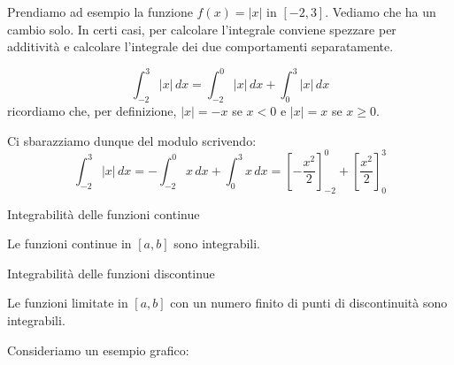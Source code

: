 \documentclass[12pt]{report}
\begin{document}
	Prendiamo ad esempio la funzione $f(x) = |x|$ in $[-2, 3]$.
	Vediamo che ha un cambio solo. In certi casi, per calcolare l'integrale conviene spezzare per additività e calcolare l'integrale dei due comportamenti separatamente.
	
	\[
	\int_{-2}^{3} |x| \, dx = \int_{-2}^{0} |x| \, dx + \int_{0}^{3} |x| \, dx
	\]
	ricordiamo che, per definizione, $|x| = -x$ se $x < 0$ e $|x| = x$ se $x \geq 0$.
	
	Ci sbarazziamo dunque del modulo scrivendo:
	\[
	\int_{-2}^{3} |x| \, dx = -\int_{-2}^{0} x \, dx + \int_{0}^{3} x \, dx = \left[ -\frac{x^2}{2} \right]_{-2}^{0} + \left[ \frac{x^2}{2} \right]_{0}^{3}
	\]
	
	\begin{teorema}{Integrabilità delle funzioni continue}{}
		
		Le funzioni continue in $[a, b]$ sono integrabili.
		
	\end{teorema}
	
	\begin{teorema}{Integrabilità delle funzioni discontinue}{}
		
		Le funzioni limitate in $[a, b]$ con un numero finito di punti di discontinuità sono integrabili.
		
	\end{teorema}
	
	Consideriamo un esempio grafico:
	
\end{document}
